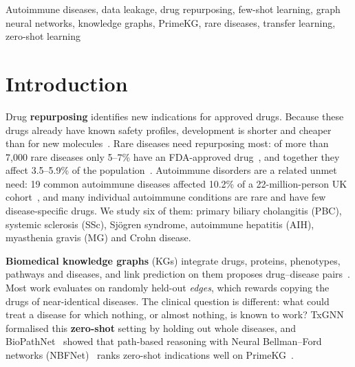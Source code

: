 \documentclass{ieeeaccess}
\begin{document}
\begin{keywords}
Autoimmune diseases, data leakage, drug repurposing, few-shot learning, graph neural networks, knowledge graphs, PrimeKG, rare diseases, transfer learning, zero-shot learning
\end{keywords}

\titlepgskip=-21pt

\maketitle

\section{Introduction}
Drug \textbf{repurposing} identifies new indications for approved drugs. Because these drugs already have known safety profiles, development is shorter and cheaper than for new molecules~\cite{pushpakom2019repurposing}. Rare diseases need repurposing most: of more than 7,000 rare diseases only 5--7\% have an FDA-approved drug~\cite{huang2024txgnn}, and together they affect 3.5--5.9\% of the population~\cite{nguengang2020rare}. Autoimmune disorders are a related unmet need: 19 common autoimmune diseases affected 10.2\% of a 22-million-person UK cohort~\cite{conrad2023autoimmune}, and many individual autoimmune conditions are rare and have few disease-specific drugs. We study six of them: primary biliary cholangitis (PBC), systemic sclerosis (SSc), Sj\"ogren syndrome, autoimmune hepatitis (AIH), myasthenia gravis (MG) and Crohn disease.

\textbf{Biomedical knowledge graphs} (KGs) integrate drugs, proteins, phenotypes, pathways and diseases, and link prediction on them proposes drug--disease pairs~\cite{himmelstein2017hetionet,bonner2022review,wei2025kgreview,kumar2025scoping}. Most work evaluates on randomly held-out \emph{edges}, which rewards copying the drugs of near-identical diseases. The clinical question is different: what could treat a disease for which nothing, or almost nothing, is known to work? TxGNN~\cite{huang2024txgnn} formalised this \textbf{zero-shot} setting by holding out whole diseases, and BioPathNet~\cite{hu2026biopathnet} showed that path-based reasoning with Neural Bellman--Ford networks (NBFNet)~\cite{zhu2021nbfnet} ranks zero-shot indications well on PrimeKG~\cite{chandak2023primekg}.
\end{document}

